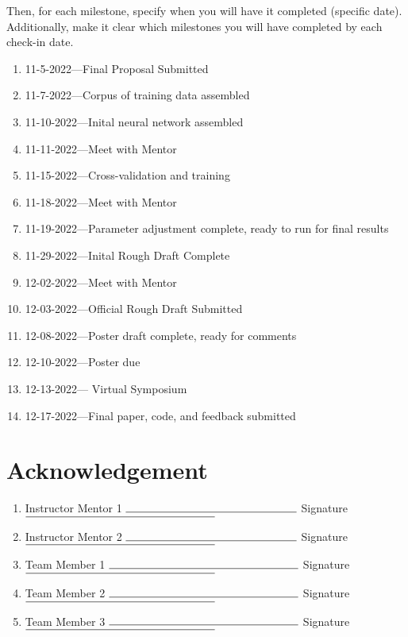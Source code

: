 \documentclass[]{article}
\begin{document}
Then, for each milestone, specify when you will have it completed (specific date). Additionally, make it clear which milestones you will have completed by each check-in date.
\begin{enumerate}
        \item 11-5-2022---Final Proposal Submitted
        \item 11-7-2022---Corpus of training data assembled
        \item 11-10-2022---Inital neural network assembled
        \item 11-11-2022---Meet with Mentor
        \item 11-15-2022---Cross-validation and training
        \item 11-18-2022---Meet with Mentor
        \item 11-19-2022---Parameter adjustment complete, ready to run for final results
        \item 11-29-2022---Inital Rough Draft Complete
        \item 12-02-2022---Meet with Mentor
        \item 12-03-2022---Official Rough Draft Submitted
        \item 12-08-2022---Poster draft complete, ready for comments
        \item 12-10-2022---Poster due
        \item 12-13-2022--- Virtual Symposium
        \item 12-17-2022---Final paper, code, and feedback submitted
\end{enumerate}

\section*{Acknowledgement}

\begin{enumerate}[wide,labelwidth=!,labelindent=0pt]
	\vspace{1cm}
	\item[] Instructor Mentor 1 $\rule{5.4cm}{0.15mm}$ \qquad Signature $\rule{6cm}{0.15mm}$ 
	
	\vspace{1cm}
	\item[] Instructor Mentor 2 $\rule{5.4cm}{0.15mm}$ \qquad Signature $\rule{6cm}{0.15mm}$ 
	
	
	\vspace{1cm}
	\item[] Team Member 1 $\rule{6cm}{0.15mm}$ \qquad Signature $\rule{6cm}{0.15mm}$ 
	
	\vspace{1cm}
	\item[] Team Member 2 $\rule{6cm}{0.15mm}$ \qquad Signature $\rule{6cm}{0.15mm}$ 
	
	\vspace{1cm}
	\item[] Team Member 3 $\rule{6cm}{0.15mm}$ \qquad Signature $\rule{6cm}{0.15mm}$ 
	
	
\end{enumerate}
\end{document}
